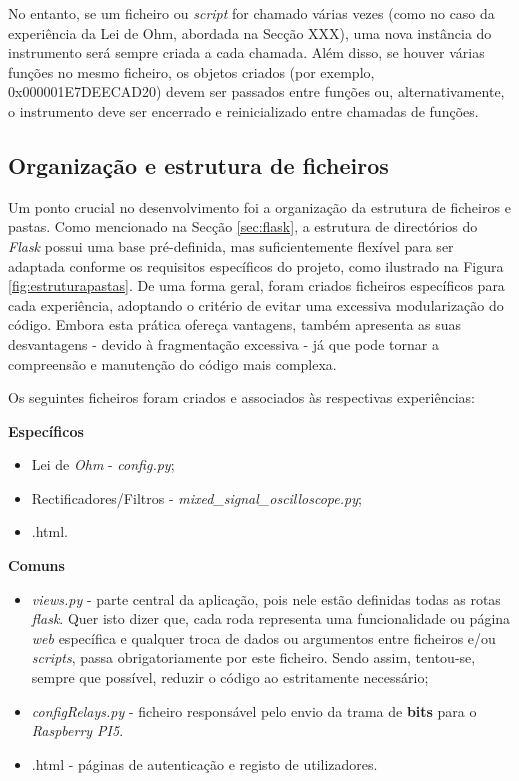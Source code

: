 No entanto, se um ficheiro ou \textit{script} for chamado várias vezes (como no caso da experiência da Lei de Ohm, abordada na Secção XXX), uma nova instância do instrumento será sempre criada a cada chamada. Além disso, se houver várias funções no mesmo ficheiro, os objetos criados (por exemplo, 0x000001E7DEECAD20) devem ser passados entre funções ou, alternativamente, o instrumento deve ser encerrado e reinicializado entre chamadas de funções.

\subsection{Organização e estrutura de ficheiros}
\label{sec:organizacao_ficheiros}
Um ponto crucial no desenvolvimento foi a organização da estrutura de ficheiros e pastas. Como mencionado na Secção \ref{sec:flask}, a estrutura de directórios do \textit{Flask} possui uma base pré-definida, mas suficientemente flexível para ser adaptada conforme os requisitos específicos do projeto, como ilustrado na Figura \ref{fig:estruturapastas}. De uma forma geral, foram criados ficheiros específicos para cada experiência, adoptando o critério de evitar uma excessiva modularização do código. Embora esta prática ofereça vantagens, também apresenta as suas desvantagens - devido à fragmentação excessiva - já que pode tornar a compreensão e manutenção do código mais complexa.

Os seguintes ficheiros foram criados e associados às respectivas experiências:

\textbf{Específicos}
\begin{itemize}
	\item Lei de \textit{Ohm} - \textit{config.py};
	\item Rectificadores/Filtros - \textit{mixed\_signal\_oscilloscope.py};
	\item {}.html.
\end{itemize}

\textbf{Comuns}
\begin{itemize}
	\item \textit{views.py} - parte central da aplicação, pois nele estão definidas todas as rotas \textit{flask}. Quer isto dizer que, cada roda representa uma funcionalidade ou página \textit{web} específica e qualquer troca de dados ou argumentos entre ficheiros e/ou \textit{scripts}, passa obrigatoriamente por este ficheiro. Sendo assim, tentou-se, sempre que possível, reduzir o código ao estritamente necessário;
	\item \textit{configRelays.py} - ficheiro responsável pelo envio da trama de \textbf{bits} para o \textit{Raspberry PI5}.
	\item {}.html - páginas de autenticação e registo de utilizadores.
\end{itemize}

